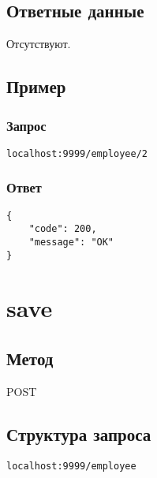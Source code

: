 \section*{Ответные данные}
Отсутствуют.

\section*{Пример}

\subsection*{Запрос}

\begin{lstlisting}
localhost:9999/employee/2
\end{lstlisting}
\hfill

\subsection*{Ответ}

\begin{lstlisting}
{
	"code": 200,
	"message": "OK"
}
\end{lstlisting}
\hfill


\chapter{save}

\section*{Метод}
POST

\section*{Структура запроса}
\begin{lstlisting}
localhost:9999/employee
\end{lstlisting}
\hfill

